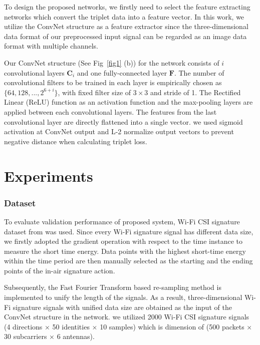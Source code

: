\documentclass[runningheads]{llncs}
\begin{document}
To design the proposed networks, we firstly need to select the feature extracting networks which convert the triplet data into a feature vector. In this work, we utilize the ConvNet structure \cite{lecun1998gradient} as a feature extractor since the three-dimensional data format of our preprocessed input signal can be regarded as an image data format with multiple channels. 

Our ConvNet structure (See Fig~\ref{fig1} (b)) for the network consists of $i$ convolutional layers $\mathbf{C}_{i}$ and one fully-connected layer $\mathbf{F}$. The number of convolutional filters to be trained in each layer is empirically chosen as $\{64, 128, ...,  2^{6+i}\}$, with fixed filter size of $3\times3$ and stride of 1. The Rectiﬁed Linear (ReLU) function as an activation function and the max-pooling layers are applied between each convolutional layers. The features from the last convolutional layer are directly flattened into a single vector.
we used sigmoid activation at ConvNet output and L-2 normalize output vectors to prevent negative distance when calculating triplet loss.


\section{Experiments}

\subsubsection{Dataset}
 To evaluate validation performance of proposed system, Wi-Fi CSI signature dataset from \cite{moon2017air} was used.
 Since every Wi-Fi signature signal has different data size, we firstly adopted the gradient operation with respect to the time instance to measure the short time energy. Data points with the highest short-time energy within the time period are then manually selected as the starting and the ending points of the in-air signature action.
 
 Subsequently, the Fast Fourier Transform based re-sampling method \cite{moon2017air} is implemented to unify the length of the signals. As a result, three-dimensional Wi-Fi signature signals with unified data size are obtained as the input of the ConvNet structure in the network.
 we utilized 2000 Wi-Fi CSI signature signals (4 directions $\times$ 50 identities $\times$ 10 samples) which is dimension of (500 packets $\times$ 30 subcarriers $\times$ 6 antennas). 
 
\end{document}
